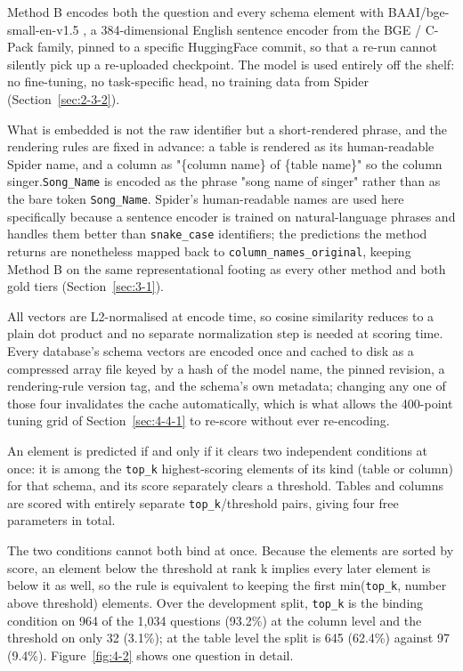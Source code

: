 Method B encodes both the question and every schema element with BAAI/bge-small-en-v1.5 \citep{xiao2023}, a 384-dimensional English sentence encoder from the BGE / C-Pack family, pinned to a specific HuggingFace commit, so that a re-run cannot silently pick up a re-uploaded checkpoint. The model is used entirely off the shelf: no fine-tuning, no task-specific head, no training data from Spider (Section~\ref{sec:2-3-2}).

What is embedded is not the raw identifier but a short-rendered phrase, and the rendering rules are fixed in advance: a table is rendered as its human-readable Spider name, and a column as "\{column name\} of \{table name\}" so the column singer.\texttt{Song\_Name} is encoded as the phrase "song name of singer" rather than as the bare token \texttt{Song\_Name}. Spider's human-readable names are used here specifically because a sentence encoder is trained on natural-language phrases and handles them better than \texttt{snake\_case} identifiers; the predictions the method returns are nonetheless mapped back to \texttt{column\_names\_original}, keeping Method B on the same representational footing as every other method and both gold tiers (Section~\ref{sec:3-1}).

All vectors are L2-normalised at encode time, so cosine similarity reduces to a plain dot product and no separate normalization step is needed at scoring time. Every database's schema vectors are encoded once and cached to disk as a compressed array file keyed by a hash of the model name, the pinned revision, a rendering-rule version tag, and the schema's own metadata; changing any one of those four invalidates the cache automatically, which is what allows the 400-point tuning grid of Section~\ref{sec:4-4-1} to re-score without ever re-encoding.

An element is predicted if and only if it clears two independent conditions at once: it is among the \texttt{top\_k} highest-scoring elements of its kind (table or column) for that schema, and its score separately clears a threshold. Tables and columns are scored with entirely separate \texttt{top\_k}/threshold pairs, giving four free parameters in total.

The two conditions cannot both bind at once. Because the elements are sorted by score, an element below the threshold at rank k implies every later element is below it as well, so the rule is equivalent to keeping the first min(\texttt{top\_k}, number above threshold) elements. Over the development split, \texttt{top\_k} is the binding condition on 964 of the 1,034 questions (93.2\%) at the column level and the threshold on only 32 (3.1\%); at the table level the split is 645 (62.4\%) against 97 (9.4\%). Figure~\ref{fig:4-2} shows one question in detail.




